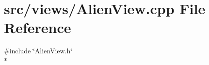 \section{src/views/\-Alien\-View.cpp File Reference}
\label{_alien_view_8cpp}
{\ttfamily \#include \char`\"{}Alien\-View.\-h\char`\"{}}\\*
